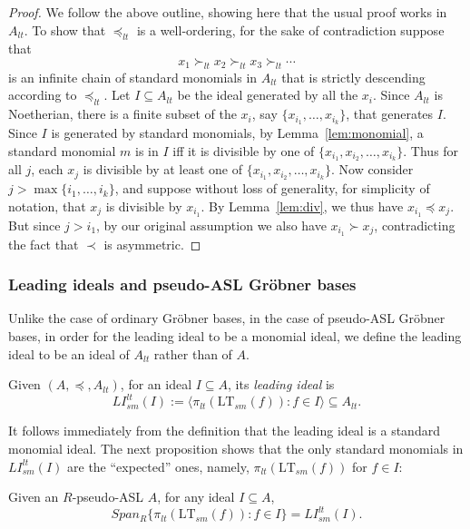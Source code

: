\documentclass[11pt,reqno]{amsart}
\newcommand{\suchthat}{:}
\newcommand{\ltsm}{\text{LT}_{sm}}
\newcommand{\lismlt}{LI_{sm}^{lt}}
\theoremstyle{definition}
\numberwithin{equation}{section}
\begin{document}
\begin{proof}
We follow the above outline, showing here that the usual proof works in $A_{lt}$. To show that $\preceq_{lt}$ is a well-ordering, for the sake of contradiction suppose that 
\[
x_1 \succ_{lt} x_2 \succ_{lt} x_3 \succ_{lt} \dotsb
\]
is an infinite chain of standard monomials in $A_{lt}$ that is strictly descending according to $\preceq_{lt}$. Let $I \subseteq A_{lt}$ be the ideal generated by all the $x_i$. Since $A_{lt}$ is Noetherian, there is a finite subset of the $x_i$, say $\{x_{i_1}, \dotsc, x_{i_k}\}$, that generates $I$. Since $I$ is generated by standard monomials, by Lemma~\ref{lem:monomial}, a standard monomial $m$ is in $I$ iff it is divisible by one of $\{x_{i_1}, x_{i_2}, \dotsc, x_{i_k}\}$. Thus for all $j$, each $x_j$ is divisible by at least one of $\{x_{i_1}, x_{i_2}, \dotsc, x_{i_k}\}$. Now consider $j > \max\{i_1, \dotsc, i_k\}$, and suppose without loss of generality, for simplicity of notation, that $x_j$ is divisible by $x_{i_1}$. By Lemma~\ref{lem:div}, we thus have $x_{i_1} \preceq x_j$. But since $j > i_1$, by our original assumption we also have $x_{i_1} \succ x_j$, contradicting the fact that $\prec$ is asymmetric.
\end{proof}

\subsubsection{Leading ideals and pseudo-ASL Gröbner bases}
Unlike the case of ordinary Gröbner bases, in the case of pseudo-ASL Gröbner bases, in order for the leading ideal to be a monomial ideal, we define the leading ideal to be an ideal of $A_{lt}$ rather than of $A$.

\begin{definition}[store=defleadingideal, note=Leading ideal]
\label{def:leading-ideal}
Given $(A,\preceq, A_{lt})$, for an ideal $I \subseteq A$, its \emph{leading ideal} is 
\[
\lismlt(I) := \langle \pi_{lt}(\ltsm(f)) \suchthat f \in I \rangle  \subseteq A_{lt}.
\] 
\end{definition}

It follows immediately from the definition that the leading ideal is a standard monomial ideal. The next proposition shows that the only standard monomials in $\lismlt(I)$ are the ``expected'' ones, namely, $\pi_{lt}(\ltsm(f))$ for $f \in I$:

\begin{proposition} \label{prop:LI}
Given an $R$-pseudo-ASL $A$, for any ideal $I \subseteq A$, \[Span_R\{\pi_{lt}(\ltsm(f)) \suchthat f \in I\} = \lismlt(I).\]
\end{proposition}
\end{document}
